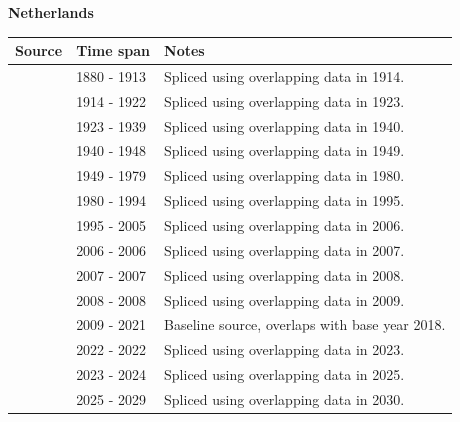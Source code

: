 \documentclass[12pt,a4paper,landscape]{article}
\begin{document}
\begin{adjustbox}{max totalsize={\paperwidth}{\paperheight},center}
\begin{minipage}[t][\textheight][t]{\textwidth}
\vspace*{0.5cm}
{}
\begin{center}
{\Large\bfseries Netherlands}
\end{center}
\vspace{0.5cm}
\begin{table}[H]
\centering
\small
\begin{tabular}{|l|l|l|}
\hline
\textbf{Source} & \textbf{Time span} & \textbf{Notes} \\
\hline
\rowcolor{white}\cite{IMF_FPP}& 1880 - 1913 &Spliced using overlapping data in 1914.\\
\rowcolor{lightgray}\cite{Mitchell}& 1914 - 1922 &Spliced using overlapping data in 1923.\\
\rowcolor{white}\cite{IMF_FPP}& 1923 - 1939 &Spliced using overlapping data in 1940.\\
\rowcolor{lightgray}\cite{Mitchell}& 1940 - 1948 &Spliced using overlapping data in 1949.\\
\rowcolor{white}\cite{IMF_FPP}& 1949 - 1979 &Spliced using overlapping data in 1980.\\
\rowcolor{lightgray}\cite{IMF_WEO}& 1980 - 1994 &Spliced using overlapping data in 1995.\\
\rowcolor{white}\cite{EUS}& 1995 - 2005 &Spliced using overlapping data in 2006.\\
\rowcolor{lightgray}\cite{OECD_EO}& 2006 - 2006 &Spliced using overlapping data in 2007.\\
\rowcolor{white}\cite{EUS}& 2007 - 2007 &Spliced using overlapping data in 2008.\\
\rowcolor{lightgray}\cite{OECD_EO}& 2008 - 2008 &Spliced using overlapping data in 2009.\\
\rowcolor{white}\cite{EUS}& 2009 - 2021 &Baseline source, overlaps with base year 2018.\\
\rowcolor{lightgray}\cite{OECD_EO}& 2022 - 2022 &Spliced using overlapping data in 2023.\\
\rowcolor{white}\cite{EUS}& 2023 - 2024 &Spliced using overlapping data in 2025.\\
\rowcolor{lightgray}\cite{IMF_WEO_forecast}& 2025 - 2029 &Spliced using overlapping data in 2030.\\
\hline
\end{tabular}

\end{table}
\end{minipage}
\end{adjustbox}
\end{document}
